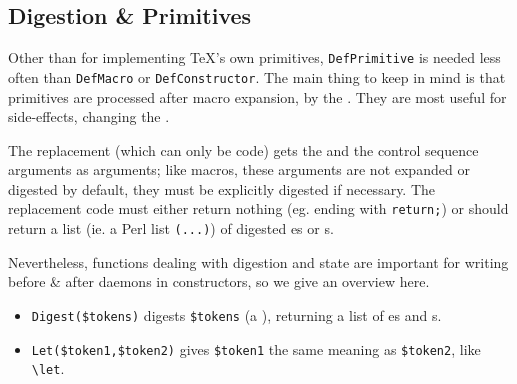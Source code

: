 \documentclass{book}
\newcommand{\ltxcode}{\lstinline[style=latexml]}
\begin{document}

\subsection[Digestion]{Digestion \& Primitives}\label{customization.latexml.digestion}
Other than for implementing \TeX's own primitives,
\texttt{DefPrimitive} is needed less often than \texttt{DefMacro} or \texttt{DefConstructor}.
 The main thing to keep in mind
is that primitives are processed after macro expansion,
by the .  They are most useful for
side-effects, changing the .

The replacement (which can only be code) gets
the  and the control sequence arguments
as arguments; like macros, these arguments are not expanded or digested
by default, they must be explicitly digested if necessary.
The replacement code must either return nothing (eg. ending with \ltxcode|return;|) or
should return a list (ie. a Perl list \ltxcode|(...)|)
of digested es or s.


Nevertheless, functions dealing with digestion and state are important for
writing before \& after daemons in constructors, so we give an overview here.
\begin{itemize}
\item \ltxcode|Digest($tokens)|
digests \ltxcode|$tokens| (a ), returning a list of es and s.
\item \ltxcode|Let($token1,$token2)| gives \ltxcode|$token1| the same meaning as \ltxcode|$token2|,
 like \verb|\let|.
\end{itemize}
\end{document}
